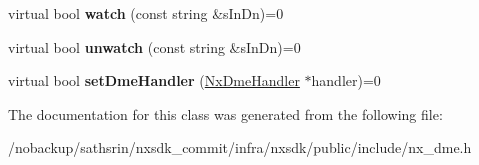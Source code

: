 \begin{DoxyCompactItemize}
\item 
\hypertarget{classnxos_1_1NxDme_afa9f2760bfcd186f5538bd6b69499f8c}{virtual bool {\bfseries watch} (const string \&s\-In\-Dn)=0}\label{classnxos_1_1NxDme_afa9f2760bfcd186f5538bd6b69499f8c}

\item 
\hypertarget{classnxos_1_1NxDme_a2d8e295bf3aa1aad28f4c762eee06833}{virtual bool {\bfseries unwatch} (const string \&s\-In\-Dn)=0}\label{classnxos_1_1NxDme_a2d8e295bf3aa1aad28f4c762eee06833}

\item 
\hypertarget{classnxos_1_1NxDme_ae9ba4358a09c11c144cd0e5f8b884b5d}{virtual bool {\bfseries set\-Dme\-Handler} (\hyperlink{classnxos_1_1NxDmeHandler}{Nx\-Dme\-Handler} $\ast$handler)=0}\label{classnxos_1_1NxDme_ae9ba4358a09c11c144cd0e5f8b884b5d}

\end{DoxyCompactItemize}


The documentation for this class was generated from the following file\-:\begin{DoxyCompactItemize}
\item 
/nobackup/sathsrin/nxsdk\-\_\-commit/infra/nxsdk/public/include/nx\-\_\-dme.\-h\end{DoxyCompactItemize}
